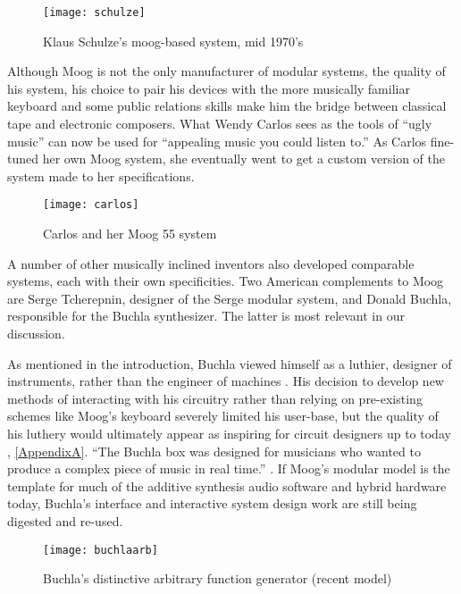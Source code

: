 \begin{itemize}
	\begin{figure}[h!]
	  \caption{Klaus Schulze's moog-based system, mid 1970's}
	  \centering
	    \texttt{[image: schulze]}
	\end{figure}

Although Moog is not the only manufacturer of modular systems, the quality of his system, his choice to pair his devices with the more musically familiar keyboard and some public relations skills make him the bridge between classical tape and electronic composers. What Wendy Carlos sees as the tools of ``ugly music'' can now be used for ``appealing music you could listen to.'' \cite[p.169]{holmes2002} As Carlos fine-tuned her own Moog system, she eventually went to get a custom version of the system made to her specifications. 

	\begin{figure}[h!]
	  \caption{Carlos and her Moog 55 system}
	  \centering
	    \texttt{[image: carlos]}
	\end{figure}

A number of other musically inclined inventors also developed comparable systems, each with their own specificities. Two American complements to Moog are Serge Tcherepnin, designer of the Serge modular system, and Donald Buchla, responsible for the Buchla synthesizer. The latter is most relevant in our discussion. 

As mentioned in the introduction, Buchla viewed himself as a luthier, designer of instruments, rather than the engineer of machines \cite{pinch2001}. His decision to develop new methods of interacting with his circuitry rather than relying on pre-existing schemes like Moog's keyboard severely limited his user-base, but the quality of his luthery would ultimately appear as inspiring for circuit designers up to today \cite{rylan2015}, \ref{AppendixA}. ``The Buchla box was designed for musicians who wanted to produce a complex piece of music in real time.'' \cite[p47]{pinch2002}. If Moog's modular model is the template for much of the additive synthesis audio software and hybrid hardware today, Buchla's interface and interactive system design work are still being digested and re-used. 

	\begin{figure}[h!]
	  \caption{Buchla's distinctive arbitrary function generator (recent model)}
	  \centering
	    \texttt{[image: buchlaarb]}
	\end{figure}


\end{itemize}
